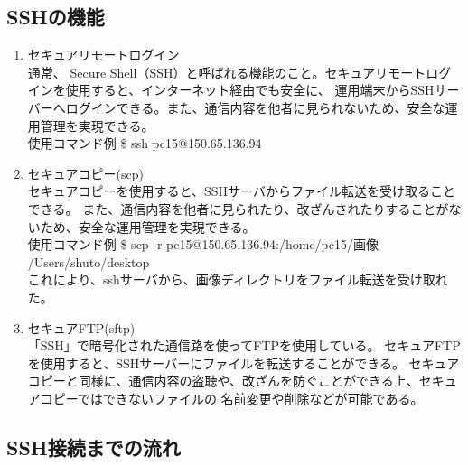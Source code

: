 \documentclass[11pt,a4j,titlepage]{jreport}
\begin{document}
\subsection{SSHの機能}



\begin{enumerate}
    \item セキュアリモートログイン\mbox{}\\通常、
    Secure Shell（SSH）と呼ばれる機能のこと。セキュアリモートログインを使用すると、インターネット経由でも安全に、
    運用端末からSSHサーバーへログインできる。また、通信内容を他者に見られないため、安全な運用管理を実現できる。
    \\使用コマンド例   \$ ssh pc15@150.65.136.94

    \item セキュアコピー(scp)\mbox{}\\セキュアコピーを使用すると、SSHサーバからファイル転送を受け取ることできる。
    また、通信内容を他者に見られたり、改ざんされたりすることがないため、安全な運用管理を実現できる。
    \\使用コマンド例   \$ scp -r pc15@150.65.136.94:/home/pc15/画像 /Users/shuto/desktop\\
    これにより、sshサーバから、画像ディレクトリをファイル転送を受け取れた。

    \item セキュアFTP(sftp)\mbox{}\\
    「SSH」で暗号化された通信路を使ってFTPを使用している。
    セキュアFTPを使用すると、SSHサーバーにファイルを転送することができる。
    セキュアコピーと同様に、通信内容の盗聴や、改ざんを防ぐことができる上、セキュアコピーではできないファイルの
    名前変更や削除などが可能である。
    
\end{enumerate}



\subsection{SSH接続までの流れ}
\end{document}

